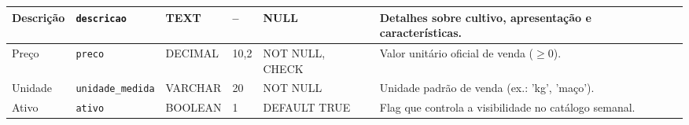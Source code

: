 \documentclass[12pt,a4paper]{article}
\begin{document}
\begin{spacing}{1.0}
\begin{tabularx}{\textwidth}{|p{1.6cm}|p{1.9cm}|p{1.2cm}|p{0.7cm}|p{1.9cm}|X|}
Descrição & \texttt{descricao} & TEXT & -- & NULL & Detalhes sobre cultivo, apresentação e características. \\ \hline

Preço & \texttt{preco} & DECIMAL & 10,2 & NOT NULL, CHECK & Valor unitário oficial de venda ($\geq 0$). \\ \hline

Unidade & \texttt{unidade\_medida} & VARCHAR & 20 & NOT NULL & Unidade padrão de venda (ex.: 'kg', 'maço'). \\ \hline

Ativo & \texttt{ativo} & BOOLEAN & 1 & DEFAULT TRUE & Flag que controla a visibilidade no catálogo semanal. \\ \hline

\end{tabularx}

\end{spacing}

\vspace{0.6cm}

\end{document}
